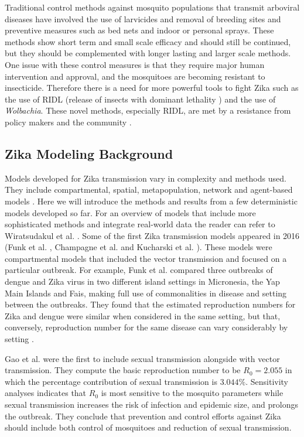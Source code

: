 \documentclass{ws-rv9x6}
\begin{document}
Traditional control methods against mosquito populations that transmit arboviral diseases have involved the use of larvicides and removal of breeding sites and preventive measures such as bed nets and indoor or personal sprays. These methods show short term and small scale efficacy and should still be continued, but they should be complemented with longer lasting and larger scale methods. One issue with these control measures is that they require major human intervention and approval, and the mosquitoes are becoming resistant to insecticide. Therefore there is a need for more powerful tools to fight Zika such as the use of RIDL (release of insects with dominant lethality ) and the use of \textit{Wolbachia}. These novel methods, especially RIDL, are met by a resistance from policy makers and the community  \cite{dickens2016time}. 
 
\subsection{Zika Modeling Background} 
Models developed for Zika transmission vary in complexity and methods used. They include compartmental, spatial, metapopulation, network and agent-based models \cite{wiratsudakul2018dynamics}. Here we will introduce the methods and results from a few deterministic models developed so far. For an overview of models that include more sophisticated methods and integrate real-world data the reader can refer to Wiratsudakul et al. \cite{wiratsudakul2018dynamics}. 
Some of the first Zika transmission models appeared in 2016 (Funk et al. \cite{funk2016comparative}, Champagne et al. \cite{champagne2016structure}  and Kucharski et al. \cite{kucharski2016transmission}). These models were compartmental models that included the vector transmission and focused on a particular outbreak. For example, Funk et al. 
compared three outbreaks of dengue and Zika virus in two different island settings in
Micronesia, the Yap Main Islands and Fais, making full use of commonalities in disease and setting between the outbreaks.
They found that the estimated reproduction numbers for Zika and dengue were similar
when considered in the same setting, but that, conversely, reproduction number for the
same disease can vary considerably by setting \cite{funk2016comparative}. 

Gao et al. \cite{gao2016prevention} were the first to include sexual transmission alongside with vector transmission. They compute the basic reproduction number to be $R_0 = 2.055$ in
which the percentage contribution of sexual transmission is $3.044\%$. 
Sensitivity analyses indicates that $R_0$ is most sensitive to the mosquito parameters
while sexual transmission increases the risk of infection and epidemic size, and prolongs the outbreak.
They conclude that prevention and control efforts against Zika should include both control of mosquitoes and reduction of sexual
transmission. 
\end{document}
